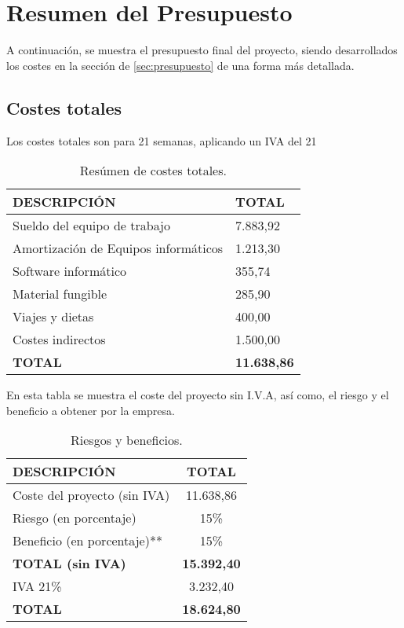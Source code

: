 \section{Resumen del Presupuesto}
\par A continuación, se muestra el presupuesto final del proyecto, siendo desarrollados los costes en la sección de \ref{sec:presupuesto} de una forma más detallada.
\subsection{Costes totales}
\par Los costes totales son para 21 semanas, aplicando un IVA del 21%
\begin{table}[H]
\begin{center}
\begin{tabular}{l l}
\textbf{DESCRIPCIÓN} & \textbf{TOTAL}\\ \hline \hline
Sueldo del equipo de trabajo & 7.883,92\\
Amortización de Equipos informáticos & 1.213,30\\
Software informático & 355,74\\
Material fungible & 285,90\\
Viajes y dietas & 400,00\\
Costes indirectos & 1.500,00\\ \hline \hline
\textbf{TOTAL} & \textbf{11.638,86}\\ \hline
\end{tabular}
\caption{Resúmen de costes totales.}
\label{tab:resumenTotal}
\end{center}
\end{table}

En esta tabla se muestra el coste del proyecto sin I.V.A, así como, el riesgo y el beneficio a obtener por la empresa.
\begin{table}[H]
\begin{center}
\begin{tabular}{l c}
\textbf{DESCRIPCIÓN} & \textbf{TOTAL}\\ \hline \hline
Coste del proyecto (sin IVA) &  11.638,86\\
Riesgo (en porcentaje) & 15\% \\
Beneficio (en porcentaje)** & 15\% \\ \hline \hline
\textbf{TOTAL (sin IVA)} & \textbf{15.392,40}\\ \hline \hline
IVA 21\% & 3.232,40 \\\hline \hline
\textbf{TOTAL} &  \textbf{18.624,80}\\ \hline
\end{tabular}
\caption{Riesgos y beneficios.}
\label{tab:total}
\end{center}
\end{table}
